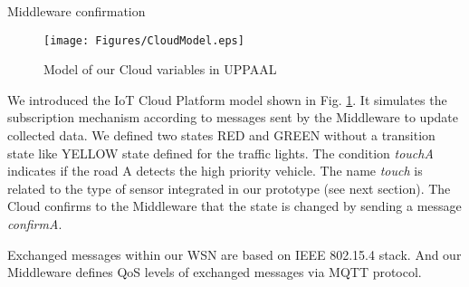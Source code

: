 
\LinesNumbered \begin{algorithm}[ht] \caption{Middleware confirmation\label{Alg:conf}}
\end{algorithm}
\begin{figure}[!htb]
\centering
\texttt{[image: Figures/CloudModel.eps]}
\caption{Model of our Cloud variables in UPPAAL}
\label{fig:CloudModel.eps}
\end{figure}


We introduced the IoT Cloud Platform model shown in Fig.
\ref{fig:CloudModel.eps}.
It simulates the subscription mechanism according to messages sent by the Middleware to update collected data.
We defined two states RED and GREEN without a transition state like YELLOW state defined for the traffic lights.
The condition \emph{touchA} indicates if the road A detects the high priority vehicle.
The name \emph{touch} is related to the type of sensor integrated in our prototype (see next section).
The Cloud confirms to the Middleware that the state is changed by sending a message \emph{confirmA}.

Exchanged messages within our WSN are based on IEEE 802.15.4 stack.
And our Middleware defines QoS levels of exchanged messages via MQTT protocol.
